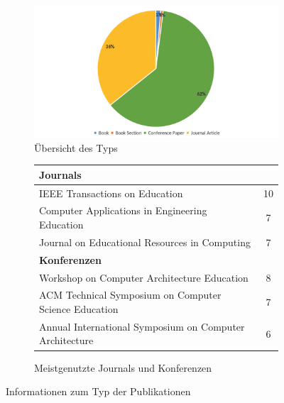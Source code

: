 \begin{figure}[!htbp]
    \centering
    \begin{subfigure}[b]{0.48\textwidth}
        \centering
        \includegraphics[width=1\textwidth]{graphics_lit/2-typ.png}
        \caption{Übersicht des Typs} 
        \label{fig:2-typ}
    \end{subfigure}
    \hfill
    \begin{subfigure}[b]{0.48\textwidth}
        \centering
        \tiny
        \begin{tabularx}{\textwidth}{X c}
            \hline
            \multicolumn{2}{l}{\textbf{Journals}} \\
            \hline
            IEEE Transactions on Education & 10 \\
            Computer Applications in Engineering Education & 7 \\
            Journal on Educational Resources in Computing & 7 \\
            \hline
            \multicolumn{2}{l}{\textbf{Konferenzen}} \\
            \hline
            Workshop on Computer Architecture Education & 8 \\
            ACM Technical Symposium on Computer Science Education & 7 \\
            Annual International Symposium on Computer Architecture & 6 \\
            \hline
        \end{tabularx}
        \caption{Meistgenutzte Journals und Konferenzen}
        \label{tab:2-typ-detail}
    \end{subfigure}
    \caption{Informationen zum Typ der Publikationen}
    \label{fig:2-typ-gesamt}
\end{figure}

